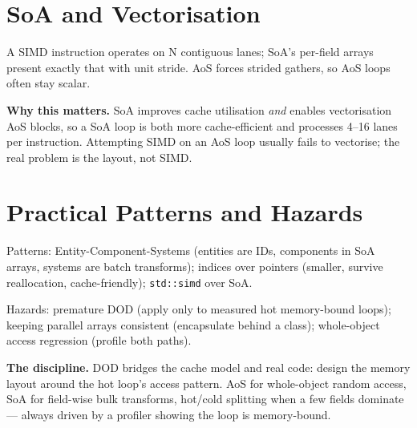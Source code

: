 \section{SoA and Vectorisation}
A SIMD instruction operates on N contiguous lanes; SoA's per-field arrays present exactly that with unit stride. AoS forces strided gathers, so AoS loops often stay scalar.

\textbf{Why this matters.} SoA improves cache utilisation \emph{and} enables vectorisation AoS blocks, so a SoA loop is both more cache-efficient and processes 4--16 lanes per instruction. Attempting SIMD on an AoS loop usually fails to vectorise; the real problem is the layout, not SIMD.

\section{Practical Patterns and Hazards}
Patterns: Entity-Component-Systems (entities are IDs, components in SoA arrays, systems are batch transforms); indices over pointers (smaller, survive reallocation, cache-friendly); \texttt{std::simd} over SoA.

Hazards: premature DOD (apply only to measured hot memory-bound loops); keeping parallel arrays consistent (encapsulate behind a class); whole-object access regression (profile both paths).

\textbf{The discipline.} DOD bridges the cache model and real code: design the memory layout around the hot loop's access pattern. AoS for whole-object random access, SoA for field-wise bulk transforms, hot/cold splitting when a few fields dominate --- always driven by a profiler showing the loop is memory-bound.
